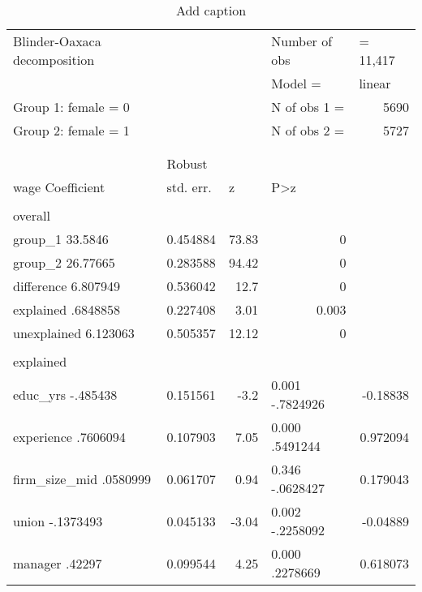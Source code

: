 \begin{table}[htbp]
  \centering
  \caption{Add caption}
    \begin{tabular}{lrrlr}
    Blinder-Oaxaca decomposition &       &       & Number of obs & \multicolumn{1}{l}{= 11,417} \\
          &       &       & Model           = & \multicolumn{1}{l}{linear} \\
    Group 1: female = 0 &       &       & N of obs 1      = & 5690 \\
    Group 2: female = 1 &       &       & N of obs 2      = & 5727 \\
          &       &       &       &  \\
          &       &       &       &  \\
          & \multicolumn{1}{l}{Robust} &       &       &  \\
    wage  Coefficient & \multicolumn{1}{l}{std. err.} & \multicolumn{1}{l}{z} & P>z   &  \\
          &       &       &       &  \\
    overall        &       &       &       &  \\
    group\_1     33.5846 & 0.454884 & 73.83 & \multicolumn{1}{r}{0} &  \\
    group\_2    26.77665 & 0.283588 & 94.42 & \multicolumn{1}{r}{0} &  \\
    difference    6.807949 & 0.536042 & 12.7  & \multicolumn{1}{r}{0} &  \\
    explained    .6848858 & 0.227408 & 3.01  & \multicolumn{1}{r}{0.003} &  \\
    unexplained    6.123063 & 0.505357 & 12.12 & \multicolumn{1}{r}{0} &  \\
          &       &       &       &  \\
    explained      &       &       &       &  \\
    educ\_yrs    -.485438 & 0.151561 & -3.2  & 0.001    -.7824926 & -0.18838 \\
    experience    .7606094 & 0.107903 & 7.05  & 0.000     .5491244 & 0.972094 \\
    firm\_size\_mid    .0580999 & 0.061707 & 0.94  & 0.346    -.0628427 & 0.179043 \\
    union   -.1373493 & 0.045133 & -3.04 & 0.002    -.2258092 & -0.04889 \\
    manager      .42297 & 0.099544 & 4.25  & 0.000     .2278669 & 0.618073 \\

\end{tabular}
\end{table}
